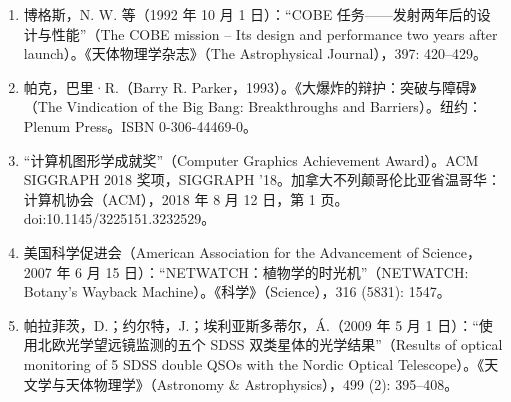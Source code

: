 \begin{enumerate}
\item 博格斯，N. W. 等（1992 年 10 月 1 日）：“COBE 任务——发射两年后的设计与性能”（The COBE mission – Its design and performance two years after launch）。《天体物理学杂志》（The Astrophysical Journal），397: 420–429。  

\item 帕克，巴里·R.（Barry R. Parker，1993）。《大爆炸的辩护：突破与障碍》（The Vindication of the Big Bang: Breakthroughs and Barriers）。纽约：Plenum Press。ISBN 0-306-44469-0。  
\item “计算机图形学成就奖”（Computer Graphics Achievement Award）。ACM SIGGRAPH 2018 奖项，SIGGRAPH '18。加拿大不列颠哥伦比亚省温哥华：计算机协会（ACM），2018 年 8 月 12 日，第 1 页。doi:10.1145/3225151.3232529。  
\item 美国科学促进会（American Association for the Advancement of Science，2007 年 6 月 15 日）：“NETWATCH：植物学的时光机”（NETWATCH: Botany's Wayback Machine）。《科学》（Science），316 (5831): 1547。  
\item 帕拉菲茨，D.；约尔特，J.；埃利亚斯多蒂尔，Á.（2009 年 5 月 1 日）：“使用北欧光学望远镜监测的五个 SDSS 双类星体的光学结果”（Results of optical monitoring of 5 SDSS double QSOs with the Nordic Optical Telescope）。《天文学与天体物理学》（Astronomy & Astrophysics），499 (2): 395–408。

\end{enumerate}


